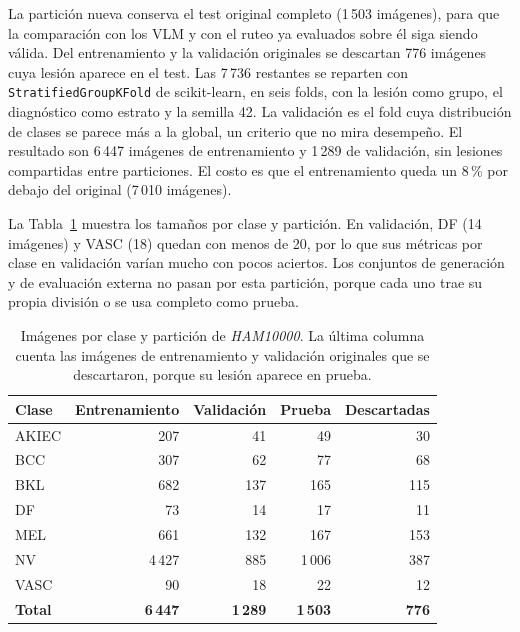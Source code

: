 La partición nueva conserva el test original completo (1\,503 imágenes), para que la comparación con los VLM y con el
ruteo ya evaluados sobre él siga siendo válida. Del entrenamiento y la validación originales se descartan 776 imágenes
cuya lesión aparece en el test. Las 7\,736 restantes se reparten con \texttt{StratifiedGroupKFold} de scikit-learn, en
seis folds, con la lesión como grupo, el diagnóstico como estrato y la semilla 42. La validación es el fold cuya
distribución de clases se parece más a la global, un criterio que no mira desempeño. El resultado son 6\,447 imágenes
de entrenamiento y 1\,289 de validación, sin lesiones compartidas entre particiones. El costo es que el entrenamiento
queda un 8\,\% por debajo del original (7\,010 imágenes).

La Tabla~\ref{tab:met_tamanos} muestra los tamaños por clase y partición. En validación, DF (14 imágenes) y VASC (18)
quedan con menos de 20, por lo que sus métricas por clase en validación varían mucho con pocos aciertos. Los conjuntos de generación y de
evaluación externa no pasan por esta partición, porque cada uno trae su propia división o se usa completo como prueba.

\begin{table}[H]
    \centering
    \caption{Imágenes por clase y partición de \emph{HAM10000}. La última columna cuenta las imágenes de entrenamiento y validación originales que se descartaron, porque su lesión aparece en prueba.}
    \label{tab:met_tamanos}
    \begin{tabularx}{\textwidth}{@{}>{\raggedright\arraybackslash}X r r r r@{}}
        \toprule
        \textbf{Clase} & \textbf{Entrenamiento} & \textbf{Validación} & \textbf{Prueba} & \textbf{Descartadas} \\
        \midrule
        AKIEC & 207 & 41 & 49 & 30 \\
        BCC & 307 & 62 & 77 & 68 \\
        BKL & 682 & 137 & 165 & 115 \\
        DF & 73 & 14 & 17 & 11 \\
        MEL & 661 & 132 & 167 & 153 \\
        NV & 4\,427 & 885 & 1\,006 & 387 \\
        VASC & 90 & 18 & 22 & 12 \\
        \midrule
        \textbf{Total} & \textbf{6\,447} & \textbf{1\,289} & \textbf{1\,503} & \textbf{776} \\
        \bottomrule
    \end{tabularx}
\end{table}

